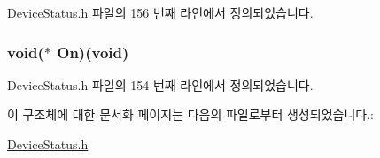 Device\-Status.\-h 파일의 156 번째 라인에서 정의되었습니다.

\hypertarget{struct___flash_af15598d60e5c6b8cace1dce5638b2aab}{
\subsubsection[{On}]{\setlength{\rightskip}{0pt plus 5cm}void($\ast$  On)(void)}}\label{struct___flash_af15598d60e5c6b8cace1dce5638b2aab}


Device\-Status.\-h 파일의 154 번째 라인에서 정의되었습니다.



이 구조체에 대한 문서화 페이지는 다음의 파일로부터 생성되었습니다.\-:\begin{DoxyCompactItemize}
\item 
\hyperlink{_device_status_8h}{Device\-Status.\-h}\end{DoxyCompactItemize}
